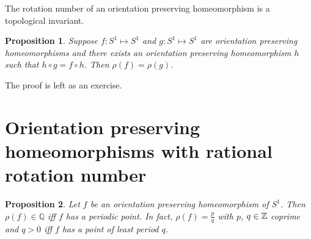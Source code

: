 \documentclass{notes}
\newcommand{\Q}{\mathbb{Q}}
\theoremstyle{plain}
\newtheorem{proposition}{Proposition}[chapter]
\begin{document}
The rotation number of an orientation preserving homeomorphism is
a topological invariant.

\begin{proposition}
Suppose $f \colon S^1 \mapsto S^1$ and $g \colon S^1 \mapsto S^1$ are
orientation preserving homeomorphisms and there exists an
orientation preserving homeomorphism $h$ such that
$h \circ g = f \circ h$.  Then $\rho(f) = \rho(g)$.
\end{proposition}

The proof is left as an exercise.

\section[Rational rotation number]%
{Orientation preserving homeomorphisms with rational rotation number}

\begin{proposition}\label{prop:s1oph}
Let $f$ be an orientation preserving homeomorphism of $S^1$.  Then
$\rho(f) \in \Q$ iff $f$ has a periodic point.  In fact,
$\rho(f) = \tfrac{p}{q}$ with $p$, $q \in \mathbb{Z}$ coprime and $q>0$ iff $f$
has a point of least period $q$.
\end{proposition}
\end{document}
